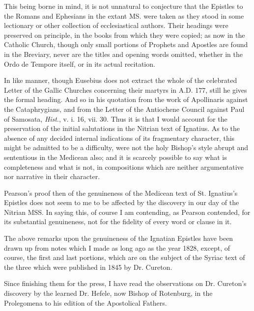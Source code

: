 This being borne in mind, it
is not unnatural to conjecture that the Epistles to the Romans and
Ephesians in the extant MS. were taken as they stood in some
lectionary or other collection of ecclesiastical authors. Their
headings were preserved on principle, in the books from which they
were copied; as now in the Catholic Church, though only small portions
of Prophets and Apostles are found in the Breviary, never are the
titles and opening words omitted, whether in the Ordo de Tempore
itself, or in its actual recitation.

In like manner, though
Eusebius does not extract the whole of the celebrated Letter of the
Gallic Churches concerning their martyrs in A.D. 177, still he gives the formal
heading. And so in his quotation from the work of Apollinaris against
the Cataphrygians, and from the Letter of the Antiochene Council
against Paul of Samosata, \emph{Hist}., v. i. 16, vii. 30. Thus it is
that I would account for the preservation of the initial salutations
in the Nitrian text of Ignatius. As to the absence of any decided
internal indications of its fragmentary character, this might be
admitted to be a difficulty, were not the holy Bishop's style abrupt
and sententious in the Medicean also; and it is scarcely possible to
say what is completeness and what is not, in compositions which are
neither argumentative nor narrative in their character.

Pearson's proof then of the
genuineness of the Medicean text of St. Ignatius's Epistles does not
seem to me to be affected by the discovery in our day of the Nitrian
MSS. In saying this, of course I am contending, as Pearson contended,
for its substantial genuineness, not for the fidelity of every word or
clause in it.


The above remarks upon the
genuineness of the Ignatian Epistles have been drawn up from notes
which I made as long ago as the year 1828, except, of course, the
first and last portions, which are on the subject of the Syriac text
of the three which were published in 1845 by Dr. Cureton.

Since finishing them for the
press, I have read the observations on Dr. Cureton's discovery by the
learned Dr. Hefele, now Bishop of Rotenburg, in the Prolegomena
to his edition of the Apostolical Fathers.

